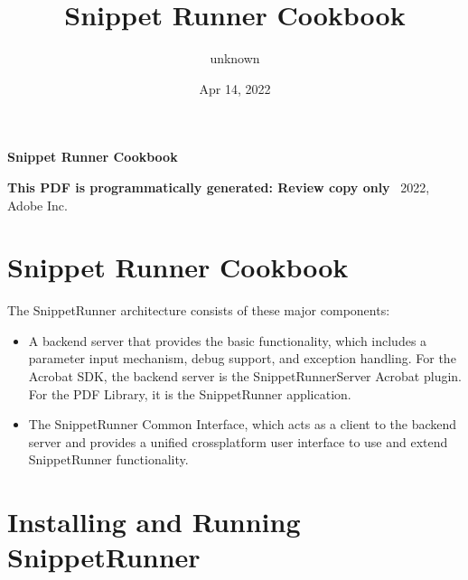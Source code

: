 \documentclass[letterpaper,12pt,english,openany,oneside]{sphinxmanual}
\title{Snippet Runner Cookbook}
\date{Apr 14, 2022}
\author{unknown}
\begin{document}
\pagestyle{empty}

    \begin{titlepage}
        \begin{figure}[h]
        \end{figure}
        \centering
        \vspace*{40mm}
        \textbf{\Huge Snippet Runner Cookbook}

        \vspace{15mm}
        \Large \textbf{{This PDF is programmatically generated: Review copy only}}
        \vfill
        \small \textcopyright\ 2022, Adobe Inc.
    \end{titlepage}
    \clearpage
    \tableofcontents
    \clearpage
    
\pagestyle{plain}

\pagestyle{normal}
\label{\detokenize{toc::doc}}





\chapter{Snippet Runner Cookbook}
\label{\detokenize{index:snippet-runner-cookbook}}\label{\detokenize{index::doc}}
The SnippetRunner architecture consists of these major components:
\begin{itemize}
\item {} 
A back\sphinxhyphen{}end server that provides the basic functionality, which includes a parameter input mechanism, debug support, and exception handling. For the Acrobat SDK, the back\sphinxhyphen{}end server is the SnippetRunnerServer Acrobat plug\sphinxhyphen{}in. For the PDF Library, it is the SnippetRunner application.

\item {} 
The SnippetRunner Common Interface, which acts as a client to the back\sphinxhyphen{}end server and provides a unified cross\sphinxhyphen{}platform user interface to use and extend SnippetRunner functionality.

\end{itemize}




\chapter{Installing and Running SnippetRunner}
\label{\detokenize{Snippet_SnippetRunnerCookbook:installing-and-running-snippetrunner}}\label{\detokenize{Snippet_SnippetRunnerCookbook::doc}}
\end{document}
